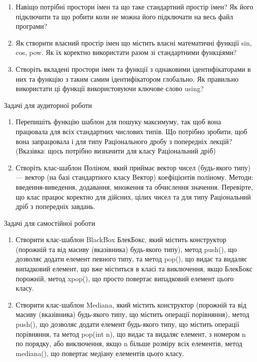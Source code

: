 \documentclass[]{article}
\begin{document}
\begin{enumerate}
\def\labelenumi{\arabic{enumi})}
\item
  Навіщо потрібні простори імен та що таке стандартний простір імен? Як
  його підключити та що робити коли не можна його підключати на весь
  файл програми?
\item
  Як створити власний простір імен що містить власні математичні функції
  sin, cos, pow. Як їх коректно використати разом зі стандартними
  функціями?
\item
  Створіть вкладені простори імен та функції з однаковими
  ідентифікаторами в них та функцію з таким самим ідентифікатором
  глобально. Як правильно використати ці функції використовуючи ключове
  слово using?
\end{enumerate}

Задачі для аудиторної роботи

\begin{enumerate}
\def\labelenumi{\arabic{enumi})}
\item
  Перепишіть функцію шаблон для пошуку максимуму, так щоб вона працювала
  для всіх стандартних числових типів. Що потрібно зробити, щоб вона
  запрацювала і для типу Раціонального дробу з попередніх лекцій?
  (Вказівка: щось потрібно визначити для класу Раціональний дріб)
\item
  Створіть клас-шаблон Поліном, який приймає вектор чисел (будь-якого
  типу) --- вектор (на базі стандартного класу Вектор) коефіцієнтів
  поліному. Методи: введення-виведення, додавання, множення та
  обчислення значення. Перевірте, що клас працює коректно для дійсних,
  цілих чисел та для типу Раціональний дріб з попередніх завдань.
\end{enumerate}

Задачі для самостійної роботи

\begin{enumerate}
\def\labelenumi{\arabic{enumi})}
\item
  Створити клас-шаблон BlackBox БлекБокс, який містить конструктор
  (порожній та від масиву (вказівника) будь-якого типу), метод push(),
  що дозволяє додати елемент певного типу, та метод pop(), що видає та
  видаляє випадковий елемент, що вже міститься в класі та виключення,
  якщо БлекБокс порожній, метод xpop(), що просто повертає випадковий
  елемент цього класу.
\item
  Створити клас-шаблон Mediana, який містить конструктор (порожній та
  від масиву (вказівника) будь-якого типу, що містить операції
  порівняння), метод push(), що дозволяє додати елемент будь-якого типу,
  що містить операції порівняння, та метод pop(int n), що видає та
  видаляє елемент, з номером n по порядку, або виключення, якщо n більше
  розміру всіх елементів, метод mediana(), що повертає медіану елементів
  цього класу.
\end{enumerate}
\end{document}
